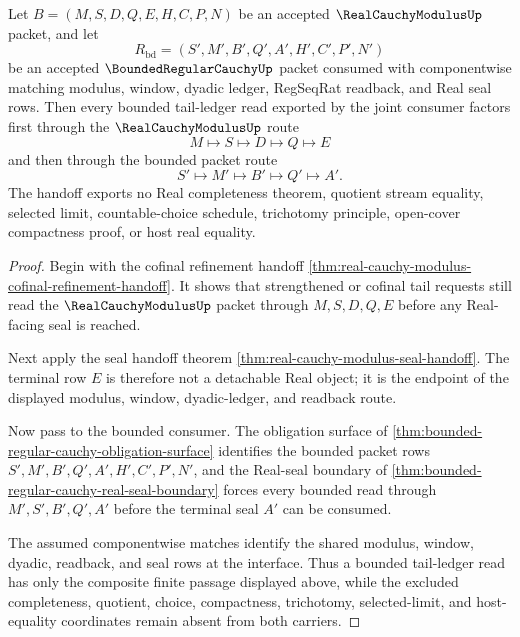 \begin{theorem}
\label{thm:real-cauchy-modulus-bounded-tail-ledger-factorization}
Let $B=(M,S,D,Q,E,H,C,P,N)$ be an accepted $\RealCauchyModulusUp$ packet, and let
$$
R_{\mathrm{bd}}=(S',M',B',Q',A',H',C',P',N')
$$
be an accepted $\BoundedRegularCauchyUp$ packet consumed with componentwise matching modulus, window, dyadic ledger, RegSeqRat readback, and Real seal rows. Then every bounded tail-ledger read exported by the joint consumer factors first through the $\RealCauchyModulusUp$ route
$$
M\longmapsto S\longmapsto D\longmapsto Q\longmapsto E
$$
and then through the bounded packet route
$$
S'\longmapsto M'\longmapsto B'\longmapsto Q'\longmapsto A'.
$$
The handoff exports no Real completeness theorem, quotient stream equality, selected limit, countable-choice schedule, trichotomy principle, open-cover compactness proof, or host real equality.
\end{theorem}
\begin{proof}
Begin with the cofinal refinement handoff \autoref{thm:real-cauchy-modulus-cofinal-refinement-handoff}. It shows that strengthened or cofinal tail requests still read the $\RealCauchyModulusUp$ packet through $M,S,D,Q,E$ before any Real-facing seal is reached.

Next apply the seal handoff theorem \autoref{thm:real-cauchy-modulus-seal-handoff}. The terminal row $E$ is therefore not a detachable Real object; it is the endpoint of the displayed modulus, window, dyadic-ledger, and readback route.

Now pass to the bounded consumer. The obligation surface of \autoref{thm:bounded-regular-cauchy-obligation-surface} identifies the bounded packet rows $S',M',B',Q',A',H',C',P',N'$, and the Real-seal boundary of \autoref{thm:bounded-regular-cauchy-real-seal-boundary} forces every bounded read through $M',S',B',Q',A'$ before the terminal seal $A'$ can be consumed.

The assumed componentwise matches identify the shared modulus, window, dyadic, readback, and seal rows at the interface. Thus a bounded tail-ledger read has only the composite finite passage displayed above, while the excluded completeness, quotient, choice, compactness, trichotomy, selected-limit, and host-equality coordinates remain absent from both carriers.
\end{proof}

